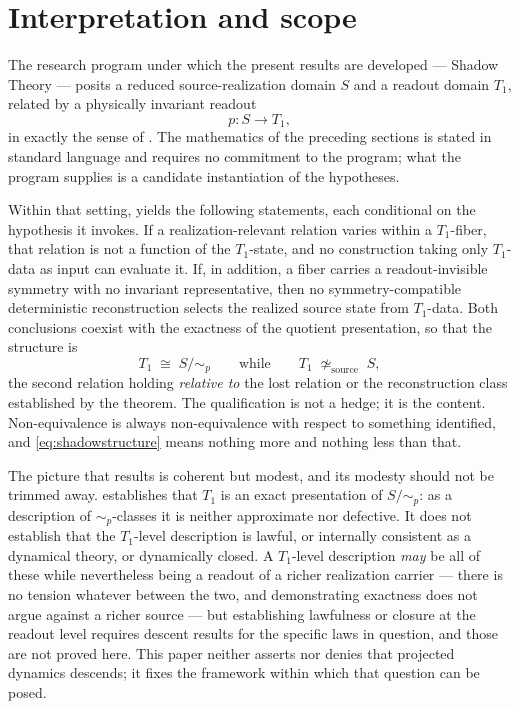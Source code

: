 \documentclass[11pt,reqno]{amsart}
\theoremstyle{plain}
\theoremstyle{definition}
\theoremstyle{remark}
\begin{document}
\section{Interpretation and scope}
\label{sec:shadow}

The research program under which the present results are developed --- Shadow Theory --- posits a reduced source-realization domain $S$ and a readout domain $T_{1}$, related by a physically invariant readout
\begin{equation}
\label{eq:shadowp}
p\colon S\longrightarrow T_{1},
\end{equation}
in exactly the sense of . The mathematics of the preceding sections is stated in standard language and requires no commitment to the program; what the program supplies is a candidate instantiation of the hypotheses.

Within that setting,  yields the following statements, each conditional on the hypothesis it invokes. If a realization-relevant relation varies within a $T_{1}$-fiber, that relation is not a function of the $T_{1}$-state, and no construction taking only $T_{1}$-data as input can evaluate it. If, in addition, a fiber carries a readout-invisible symmetry with no invariant representative, then no symmetry-compatible deterministic reconstruction selects the realized source state from $T_{1}$-data. Both conclusions coexist with the exactness of the quotient presentation, so that the structure is
\begin{equation}
\label{eq:shadowstructure}
T_{1}\;\cong\;S/\!\sim_{p}
\qquad\text{while}\qquad
T_{1}\;\not\simeq_{\mathrm{source}}\;S,
\end{equation}
the second relation holding \emph{relative to} the lost relation or the reconstruction class established by the theorem. The qualification is not a hedge; it is the content. Non-equivalence is always non-equivalence with respect to something identified, and \eqref{eq:shadowstructure} means nothing more and nothing less than that.

The picture that results is coherent but modest, and its modesty should not be trimmed away.  establishes that $T_{1}$ is an exact presentation of $S/\!\sim_{p}$: as a description of $\sim_{p}$-classes it is neither approximate nor defective. It does not establish that the $T_{1}$-level description is lawful, or internally consistent as a dynamical theory, or dynamically closed. A $T_{1}$-level description \emph{may} be all of these while nevertheless being a readout of a richer realization carrier --- there is no tension whatever between the two, and demonstrating exactness does not argue against a richer source --- but establishing lawfulness or closure at the readout level requires descent results for the specific laws in question, and those are not proved here. This paper neither asserts nor denies that projected dynamics descends; it fixes the framework within which that question can be posed.
\end{document}
